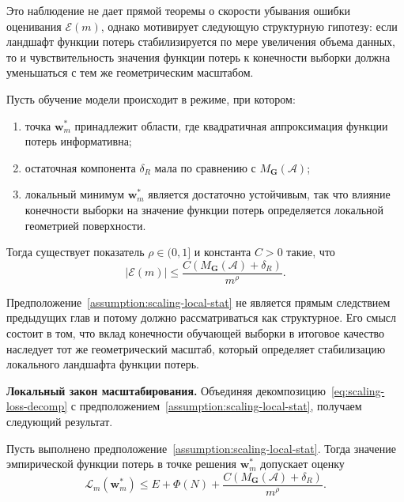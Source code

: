 Это наблюдение не дает прямой теоремы о скорости убывания ошибки оценивания $\mathcal E(m)$, однако мотивирует следующую структурную гипотезу: если ландшафт функции потерь стабилизируется по мере увеличения объема данных, то и чувствительность значения функции потерь к конечности выборки должна уменьшаться с тем же геометрическим масштабом.

\begin{assumption}
    \label{assumption:scaling-local-stat}
    Пусть обучение модели происходит в режиме, при котором:
    \begin{enumerate}
        \item точка $\mathbf w_m^*$ принадлежит области, где квадратичная аппроксимация функции потерь информативна;
        \item остаточная компонента $\delta_R$ мала по сравнению с $M_{\mathbf G}(\mathcal A)$;
        \item локальный минимум $\mathbf w_m^*$ является достаточно устойчивым, так что влияние конечности выборки на значение функции потерь определяется локальной геометрией поверхности.
    \end{enumerate}
    Тогда существует показатель $\rho \in (0,1]$ и константа $C>0$ такие, что
    \begin{equation}
        \label{eq:scaling-estimation-assumption}
        |\mathcal E(m)|
        \le
        \frac{C\left(M_{\mathbf G}(\mathcal A)+\delta_R\right)}{m^{\rho}}.
    \end{equation}
\end{assumption}

\begin{remark}
    Предположение~\ref{assumption:scaling-local-stat} не является прямым следствием предыдущих глав и потому должно рассматриваться как структурное. Его смысл состоит в том, что вклад конечности обучающей выборки в итоговое качество наследует тот же геометрический масштаб, который определяет стабилизацию локального ландшафта функции потерь.
\end{remark}

\textbf{Локальный закон масштабирования.} Объединяя декомпозицию~\eqref{eq:scaling-loss-decomp} с предположением~\ref{assumption:scaling-local-stat}, получаем следующий результат.

\begin{theorem}
    \label{thm:scaling-local-law}
    Пусть выполнено предположение~\ref{assumption:scaling-local-stat}. Тогда значение эмпирической функции потерь в точке решения $\mathbf w_m^*$ допускает оценку
    \begin{equation}
        \label{eq:scaling-local-law}
        \mathcal L_m(\mathbf w_m^*)
        \le
        E
        +
        \Phi(N)
        +
        \frac{C\left(M_{\mathbf G}(\mathcal A)+\delta_R\right)}{m^{\rho}}.
    \end{equation}
\end{theorem}

